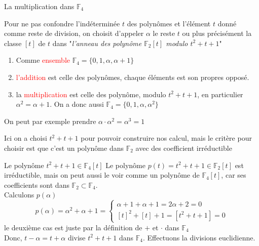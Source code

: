 
\begin{parag}{La multiplication dans $\mathbb{F}_4$}
    
        Pour ne pas confondre l'indéterminée $t$ des polynômes et l'élément $t$ donné comme reste de division, on choisit d'appeler $\alpha$ le reste $t$ ou plus précisément la classe $[t]$ de $t$ dans "\textit{l'anneau des polynôme $\mathbb{F}_2[t]$ modulo $t^2 + t + 1$}"
        \begin{enumerate}
            \item Comme \textcolor{red}{ensemble} $\mathbb{F}_4 = \{0, 1, \alpha, \alpha + 1\}$
            \item \textcolor{red}{l'addition} est celle des polynômes, chaque éléments est son propres opposé.
            \item la \textcolor{red}{multiplication} est celle des polynôme, modulo $t^2 + t + 1$, en particulier $\alpha^2 = \alpha + 1$. On a donc aussi $\mathbb{F}_4 = \{0, 1, \alpha, \alpha^2\}$   
        \end{enumerate}
        On peut par exemple prendre $\alpha \cdot \alpha^2 = \alpha^3 = 1$
        \begin{framedremark}
            Ici on a choisi $t^2 + t + 1$ pour pouvoir construire nos calcul, mais le critère pour choisir est que c'est un polynôme dans $\mathbb{F}_2$ avec des coefficient irréductible
        \end{framedremark}
        \begin{subparag}{Le polynôme $t^2 + t + 1 \in \mathbb{F}_4[t]$}
            Le polynôme $p(t) = t^2 + t + 1 \in \mathbb{F}_2[t]$ est irréductible, mais on peut aussi le voir comme un polynôme de $\mathbb{F}_4[t]$, car ses coefficients sont dans $\mathbb{F}_2 \subset \mathbb{F}_4$.
            \\
            Calculons $p(\alpha)$
            \[p(\alpha) = \alpha^2 + \alpha + 1 = \begin{cases}
                \alpha + 1  + \alpha + 1 = 2\alpha + 2  = 0\\
                [t]^2 + [t] + 1  = [t^2 + t + 1] = 0
            \end{cases}\]
            le deuxième cas est juste par la définition de $+$ et $\cdot $ dans $\mathbb{F}_4$\\
            Donc, $t-\alpha = t + \alpha$ divise $t^2 + t + 1$ dans $\mathbb{F}_4$. Effectuons la divisions euclidienne.
            

\end{subparag}
\end{parag}
